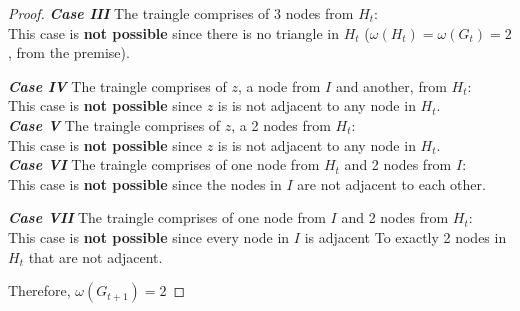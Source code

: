 \documentclass{article}
\begin{document}
\begin{proof}
\textbf{\textit{Case III}}
    The traingle comprises of 3 nodes from $H_t$:\\
    This case is \textbf{not possible} 
    since there is no triangle in $H_t$
    ($\omega(H_t) = \omega(G_t) = 2$,
    from the premise).

\textbf{\textit{Case IV}}
    The traingle comprises of $z$, a node from $I$
    and another, from $H_t$:\\
    This case is \textbf{not possible} 
    since $z$ is is not adjacent to any node in $H_t$.\\

\textbf{\textit{Case V}}
    The traingle comprises of $z$, a 2 nodes
    from $H_t$:\\
    This case is \textbf{not possible} 
    since $z$ is is not adjacent to any node in $H_t$.\\

\textbf{\textit{Case VI}}
    The traingle comprises of one node
    from $H_t$ and 2 nodes 
    from $I$:\\
    This case is \textbf{not possible} 
    since the nodes in $I$ are not adjacent to each other.

\textbf{\textit{Case VII}}
    The traingle comprises of one node
    from $I$ and 2 nodes
    from $H_t$:\\
    This case is \textbf{not possible} 
    since every node in $I$ is adjacent To
    exactly 2 nodes in $H_t$ that are not adjacent.

Therefore, $\omega(G_{t+1})=2$

\end{proof}



\end{document}
